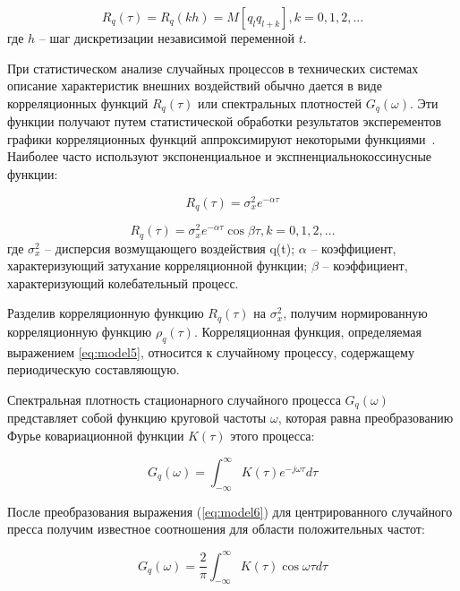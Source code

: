 \begin{equation} \label{eq:model3}
{R}_{q}(\tau) = {R}_{q}(kh) = M[q_l q_{l+k}], k=0,1,2,...
\end{equation}
где $h$ – шаг дискретизации независимой переменной $t$.

При статистическом анализе случайных процессов в технических системах
описание характеристик внешних воздействий обычно дается в виде
корреляционных функций ${R}_{q}(\tau)$ или спектральных плотностей $G_q(\omega)$. Эти
функции получают путем статистической обработки результатов эксперементов
графики корреляционных функций аппроксимируют некоторыми функциями~\cite{modeling:2004}. Наиболее часто используют экспоненциальное и экспненциальнокоссинусные функции:


\begin{equation} \label{eq:model4}
{R}_{q}(\tau) = {\sigma}_{x}^{2} e^{-\alpha \tau}
\end{equation}

\begin{equation} \label{eq:model5}
{R}_{q}(\tau) = {\sigma}_{x}^{2} e^{-\alpha \tau} \cos\beta\tau, k=0,1,2,...
\end{equation}
где ${\sigma}_{x}^{2}$ -- дисперсия возмущающего воздействия q(t);
$\alpha$ -- коэффициент, характеризующий затухание корреляционной функции;
$\beta$ -- коэффициент, характеризующий колебательный процесс.


Разделив корреляционную функцию ${R}_{q}(\tau)$ на ${\sigma}_{x}^{2}$, получим нормированную
корреляционную функцию ${\rho}_{q}(\tau)$. Корреляционная функция, определяемая
выражением \ref{eq:model5}, относится к случайному процессу, содержащему
периодическую составляющую.

Спектральная плотность стационарного случайного процесса $G_q(\omega)$
представляет собой функцию круговой частоты $\omega$, которая равна
преобразованию Фурье ковариационной функции $K(\tau)$ этого процесса:

\begin{equation} \label{eq:model6}
G_q(\omega) = \int_{-\infty}^{\infty} K(\tau) e^{-j\omega\tau} d\tau
\end{equation}

После преобразования выражения (\ref{eq:model6}) для центрированного случайного
пресса получим известное соотношения для области положительных частот:

\begin{equation} \label{eq:model7}
G_q(\omega) = \frac{2}{\pi}\int_{-\infty}^{\infty} K(\tau) \cos\omega\tau d\tau
\end{equation}

